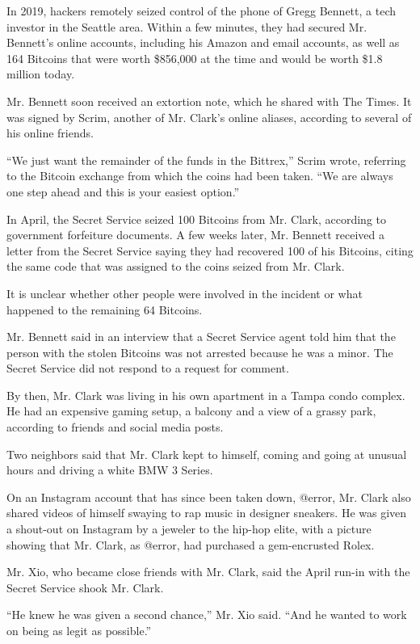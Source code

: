 In 2019, hackers remotely seized control of the phone of Gregg Bennett,
a tech investor in the Seattle area. Within a few minutes, they had
secured Mr. Bennett's online accounts, including his Amazon and email
accounts, as well as 164 Bitcoins that were worth \$856,000 at the time
and would be worth \$1.8 million today.

Mr. Bennett soon received an extortion note, which he shared with The
Times. It was signed by Scrim, another of Mr. Clark's online aliases,
according to several of his online friends.

``We just want the remainder of the funds in the Bittrex,'' Scrim wrote,
referring to the Bitcoin exchange from which the coins had been taken.
``We are always one step ahead and this is your easiest option.''

In April, the Secret Service seized 100 Bitcoins from Mr. Clark,
according to government forfeiture documents. A few weeks later, Mr.
Bennett received a letter from the Secret Service saying they had
recovered 100 of his Bitcoins, citing the same code that was assigned to
the coins seized from Mr. Clark.

It is unclear whether other people were involved in the incident or what
happened to the remaining 64 Bitcoins.

Mr. Bennett said in an interview that a Secret Service agent told him
that the person with the stolen Bitcoins was not arrested because he was
a minor. The Secret Service did not respond to a request for comment.

By then, Mr. Clark was living in his own apartment in a Tampa condo
complex. He had an expensive gaming setup, a balcony and a view of a
grassy park, according to friends and social media posts.

Two neighbors said that Mr. Clark kept to himself, coming and going at
unusual hours and driving a white BMW 3 Series.

On an Instagram account that has since been taken down, @error, Mr.
Clark also shared videos of himself swaying to rap music in designer
sneakers. He was given a shout-out on Instagram by a jeweler to the
hip-hop elite, with a picture showing that Mr. Clark, as @error, had
purchased a gem-encrusted Rolex.

Mr. Xio, who became close friends with Mr. Clark, said the April run-in
with the Secret Service shook Mr. Clark.

``He knew he was given a second chance,'' Mr. Xio said. ``And he wanted
to work on being as legit as possible.''

